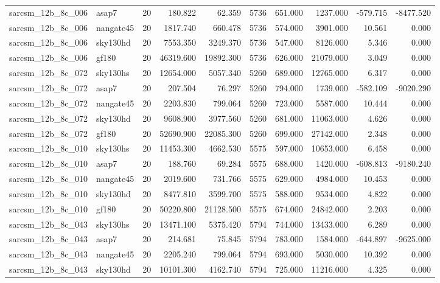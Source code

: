 \begin{tabular}{llrrrrrrrr}
sarcsm\_12b\_8c\_006 & asap7 & 20 & 180.822 & 62.359 & 5736 & 651.000 & 1237.000 & -579.715 & -8477.520 \\
sarcsm\_12b\_8c\_006 & nangate45 & 20 & 1817.740 & 660.478 & 5736 & 574.000 & 3901.000 & 10.561 & 0.000 \\
sarcsm\_12b\_8c\_006 & sky130hd & 20 & 7553.350 & 3249.370 & 5736 & 547.000 & 8126.000 & 5.346 & 0.000 \\
sarcsm\_12b\_8c\_006 & gf180 & 20 & 46319.600 & 19892.300 & 5736 & 626.000 & 21079.000 & 3.049 & 0.000 \\
sarcsm\_12b\_8c\_072 & sky130hs & 20 & 12654.000 & 5057.340 & 5260 & 689.000 & 12765.000 & 6.317 & 0.000 \\
sarcsm\_12b\_8c\_072 & asap7 & 20 & 207.504 & 76.297 & 5260 & 794.000 & 1739.000 & -582.109 & -9020.290 \\
sarcsm\_12b\_8c\_072 & nangate45 & 20 & 2203.830 & 799.064 & 5260 & 723.000 & 5587.000 & 10.444 & 0.000 \\
sarcsm\_12b\_8c\_072 & sky130hd & 20 & 9608.900 & 3977.560 & 5260 & 681.000 & 11063.000 & 4.626 & 0.000 \\
sarcsm\_12b\_8c\_072 & gf180 & 20 & 52690.900 & 22085.300 & 5260 & 699.000 & 27142.000 & 2.348 & 0.000 \\
sarcsm\_12b\_8c\_010 & sky130hs & 20 & 11453.300 & 4662.530 & 5575 & 597.000 & 10653.000 & 6.458 & 0.000 \\
sarcsm\_12b\_8c\_010 & asap7 & 20 & 188.760 & 69.284 & 5575 & 688.000 & 1420.000 & -608.813 & -9180.240 \\
sarcsm\_12b\_8c\_010 & nangate45 & 20 & 2019.600 & 731.766 & 5575 & 629.000 & 4984.000 & 10.453 & 0.000 \\
sarcsm\_12b\_8c\_010 & sky130hd & 20 & 8477.810 & 3599.700 & 5575 & 588.000 & 9534.000 & 4.822 & 0.000 \\
sarcsm\_12b\_8c\_010 & gf180 & 20 & 50220.800 & 21128.500 & 5575 & 674.000 & 24842.000 & 2.203 & 0.000 \\
sarcsm\_12b\_8c\_043 & sky130hs & 20 & 13471.100 & 5375.420 & 5794 & 744.000 & 13433.000 & 6.289 & 0.000 \\
sarcsm\_12b\_8c\_043 & asap7 & 20 & 214.681 & 75.845 & 5794 & 783.000 & 1584.000 & -644.897 & -9625.000 \\
sarcsm\_12b\_8c\_043 & nangate45 & 20 & 2205.240 & 799.064 & 5794 & 693.000 & 5030.000 & 10.392 & 0.000 \\
sarcsm\_12b\_8c\_043 & sky130hd & 20 & 10101.300 & 4162.740 & 5794 & 725.000 & 11216.000 & 4.325 & 0.000 \\

\end{tabular}
